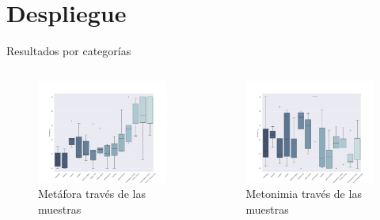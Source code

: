 \documentclass[presentation]{beamer}
\begin{document}
\section{Despliegue}
\label{sec:org162cd6d}
\begin{frame}[label={sec:org732e287}]{Resultados por categorías}
\begin{columns}
\begin{column}{0.48\columnwidth}
\begin{figure}[H]
\centering
\includegraphics[width=\linewidth]{./resultados/graphs/total/accum_cat_metafora.png}

\caption{Metáfora través de las muestras }
\end{figure}
\end{column}

\begin{column}{0.48\columnwidth}
\begin{figure}[H]
\includegraphics[width=\linewidth]{./resultados/graphs/total/accum_cat_metonimia.png}
\caption{Metonimia través de las muestras }
\centering

\end{figure}
\end{column}
\end{columns}
\end{frame}
\end{document}

